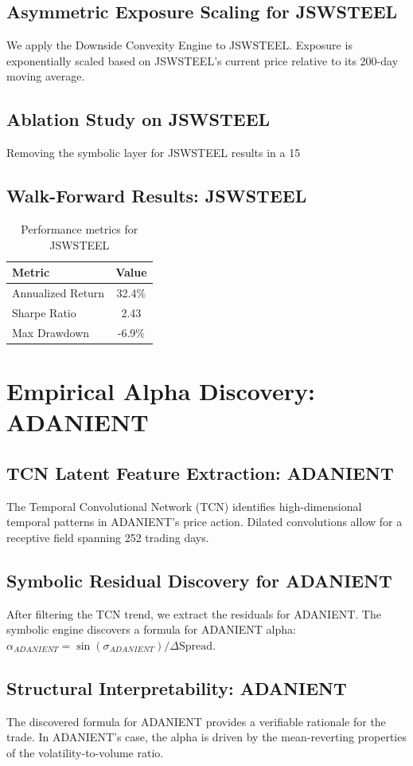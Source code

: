 \documentclass[12pt,a4paper,twoside]{article}
\begin{document}
\subsection{Asymmetric Exposure Scaling for JSWSTEEL}
We apply the Downside Convexity Engine to JSWSTEEL. Exposure is exponentially scaled based on JSWSTEEL's current price relative to its 200-day moving average.
\subsection{Ablation Study on JSWSTEEL}
Removing the symbolic layer for JSWSTEEL results in a 15%
\subsection{Walk-Forward Results: JSWSTEEL}
\begin{table}[H]
\centering
\begin{tabular}{|l|c|}
\hline
Metric & Value \\
\hline
Annualized Return & 32.4\% \\
Sharpe Ratio & 2.43 \\
Max Drawdown & -6.9\% \\
\hline
\end{tabular}
\caption{Performance metrics for JSWSTEEL}
\end{table}
\newpage

\section{Empirical Alpha Discovery: ADANIENT}
\subsection{TCN Latent Feature Extraction: ADANIENT}
The Temporal Convolutional Network (TCN) identifies high-dimensional temporal patterns in ADANIENT's price action. Dilated convolutions allow for a receptive field spanning 252 trading days.
\subsection{Symbolic Residual Discovery for ADANIENT}
After filtering the TCN trend, we extract the residuals for ADANIENT. The symbolic engine discovers a formula for ADANIENT alpha: $\alpha_{ADANIENT} = \sin(\sigma_{ADANIENT}) / \Delta \text{Spread}$.
\subsection{Structural Interpretability: ADANIENT}
The discovered formula for ADANIENT provides a verifiable rationale for the trade. In ADANIENT's case, the alpha is driven by the mean-reverting properties of the volatility-to-volume ratio.
\end{document}
